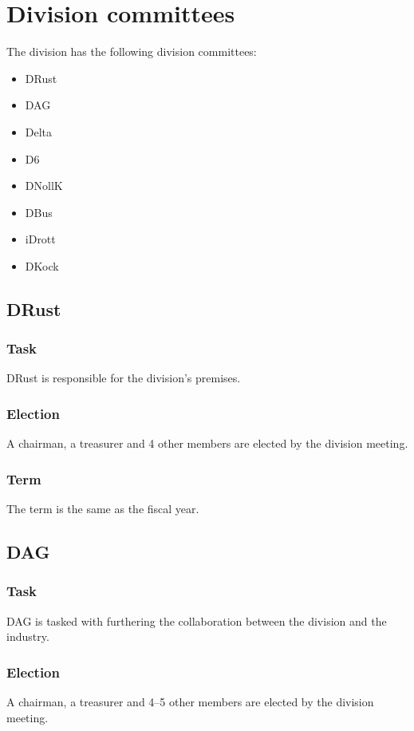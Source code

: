 \section{Division committees}

The division has the following division committees:

\begin{itemize}
  \item DRust
  \item DAG 
  \item Delta 
  \item D6 
  \item DNollK
  \item DBus
  \item iDrott
  \item DKock
\end{itemize}

\subsection{DRust}

\subsubsection{Task}
DRust is responsible for the division's premises.

\subsubsection{Election}
A chairman, a treasurer and 4 other members are elected by the division meeting. 

\subsubsection{Term}
The term is the same as the fiscal year. 

\subsection{DAG}

\subsubsection{Task}
DAG is tasked with furthering the collaboration between the division and the industry. 

\subsubsection{Election}
A chairman, a treasurer and 4--5 other members are elected by the division meeting. 

